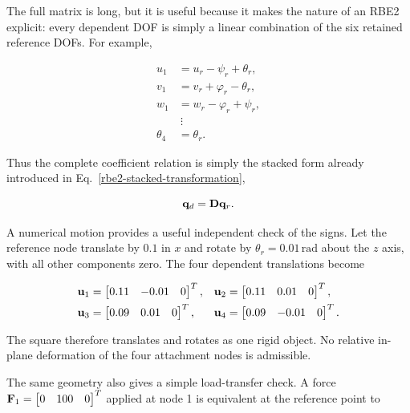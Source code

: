 The full matrix is long, but it is useful because it makes the nature of an RBE2
explicit: every dependent DOF is simply a linear combination of the six retained
reference DOFs. For example,

\begin{equation}
\begin{aligned}
    u_1 &= u_r-\psi_r+\theta_r,\\
    v_1 &= v_r+\varphi_r-\theta_r,\\
    w_1 &= w_r-\varphi_r+\psi_r,\\
    &\ \vdots\\
    \theta_4 &= \theta_r.
\end{aligned}
\end{equation}

Thus the complete coefficient relation is simply the stacked form already
introduced in Eq.~\eqref{rbe2-stacked-transformation},

\begin{equation}
    \mathbf{q}_d=\mathbf{D}\mathbf{q}_r.
\end{equation}

A numerical motion provides a useful independent check of the signs. Let the
reference node translate by $0.1$ in $x$ and rotate by
$\theta_r=0.01\,\mathrm{rad}$ about the $z$ axis, with all other components
zero. The four dependent translations become

\begin{equation}
\begin{aligned}
    \mathbf{u}_1&=\begin{bmatrix}0.11&-0.01&0\end{bmatrix}^{T}, &
    \mathbf{u}_2&=\begin{bmatrix}0.11& 0.01&0\end{bmatrix}^{T},\\
    \mathbf{u}_3&=\begin{bmatrix}0.09& 0.01&0\end{bmatrix}^{T}, &
    \mathbf{u}_4&=\begin{bmatrix}0.09&-0.01&0\end{bmatrix}^{T}.
\end{aligned}
\end{equation}

The square therefore translates and rotates as one rigid object. No relative
in-plane deformation of the four attachment nodes is admissible.

The same geometry also gives a simple load-transfer check. A force
$\mathbf{F}_1=\begin{bmatrix}0&100&0\end{bmatrix}^{T}$ applied at node 1 is
equivalent at the reference point to

